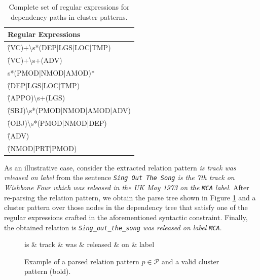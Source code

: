 \begin{table}[]
\scriptsize
\centering
    \begin{tabular}{ l}
    \hline
    Regular Expressions \\
    \hline
    \^(VC)+\textbackslash s*(DEP|LGS|LOC|TMP) \\
    \^(VC)+\textbackslash s+(ADV)\\s*(PMOD|NMOD|AMOD)* \\
    \^(DEP|LGS|LOC|TMP) \\
    \^(APPO)\textbackslash s+(LGS) \\
    \^(SBJ)\textbackslash s*(PMOD|NMOD|AMOD|ADV) \\
    \^(OBJ)\textbackslash s*(PMOD|NMOD|DEP) \\
    \^(ADV) \\
    \^(NMOD|PRT|PMOD) \\
    \hline
    \end{tabular}
    \caption{Complete set of regular expressions for dependency paths in cluster patterns.}
    \label{tbl:kb:expressions}
\end{table}

As an illustrative case, consider the extracted relation pattern \textit{is track was released on label} from the sentence \textit{\texttt{Sing Out The Song} is the 7th track on Wishbone Four which was released in the UK May 1973 on the \texttt{MCA} label}. After re-parsing the relation pattern, we obtain the parse tree shown in Figure \ref{fig:kb:parsedpattern} and a cluster pattern over those nodes in the dependency tree that satisfy one of the regular expressions crafted in the aforementioned syntactic constraint. Finally, the obtained relation is \textit{\texttt{Sing\_out\_the\_song} was released on label \texttt{MCA}}.

\begin{figure}[!htb]
\centering
\begin{dependency}
\begin{deptext}[column sep=.5cm]
is \& track \& was \& released \& on \& label \\
\end{deptext}




\end{dependency}
\vspace*{-5mm}
\caption{Example of a parsed relation pattern $p \in \mathcal{P}$ and a valid cluster pattern (bold).}
\label{fig:kb:parsedpattern}
\end{figure}


